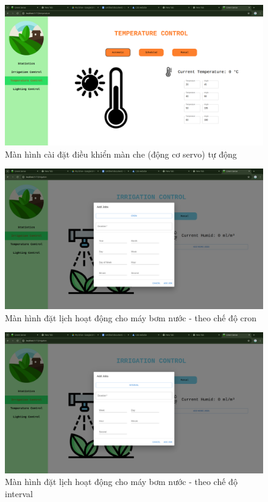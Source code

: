 \begin{figure}[H]
    \centering
    \includegraphics[width=1\linewidth]{content/images/temp_automatic.png}
    \caption{Màn hình cài đặt điều khiển màn che (động cơ servo) tự động}
\end{figure}

\begin{figure}[H]
    \centering
    \includegraphics[width=1\linewidth]{content/images/pump_job_cron.png}
    \caption{Màn hình đặt lịch hoạt động cho máy bơm nước - theo chế độ cron}
\end{figure}

\begin{figure}[H]
    \centering
    \includegraphics[width=1\linewidth]{content/images/pump_job_interval.png}
    \caption{Màn hình đặt lịch hoạt động cho máy bơm nước - theo chế độ interval}
\end{figure}

